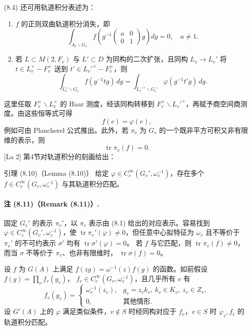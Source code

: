(8.4) 还可用轨道积分表述为：
\begin{enumerate}
\item[(i)] $f$ 的正则双曲轨道积分消失，即
\begin{equation}
 \int_{A_v\backslash G_v}f\!\left(g^{-1}\begin{pmatrix}a&0\\0&1\end{pmatrix}g\right)dg=0,
 \quad a\ne1.\tag{8.7}
\end{equation}
\item[(ii)] 若 $L\subset M(2,F_v)$ 与 $L'\subset D$ 为同构的二次扩张，且同构
$L_v\to L_v'$ 将 $t\in L_v^\times-F_v^\times$ 送到 $t'\in L_v'^\times-F_v^\times$，则
\[
 \int_{L_v^\times\backslash G_v}f(g^{-1}tg)\,dg
 =\int_{L_v'^\times\backslash G_v'}\varphi(g^{-1}t'g)\,dg.
\]
\end{enumerate}
这里任取 $F_v^\times\backslash L_v^\times$ 的 Haar 测度，经该同构转移到
$F_v^\times\backslash L_v'^\times$，再赋予商空间商测度。由这些恒等式可得
\begin{equation}
 f(e)=\varphi(e),\tag{8.8}
\end{equation}
例如可由 Plancherel 公式推出。此外，若 $\pi_v$ 为 $G_v$ 的一个既非平方可积又非有限维的表示，则
\begin{equation}
 \operatorname{tr}\pi_v(f)=0.\tag{8.9}
\end{equation}
[La 2] 第4节对轨道积分的刻画给出：
\begin{originaltheorem}{引理 (8.10)（Lemma (8.10)）}
给定 $\varphi\in C_c^\infty(G_v',\omega_v^{-1})$，存在多个
$f\in C_c^\infty(G_v,\omega_v^{-1})$ 与其轨道积分匹配。
\end{originaltheorem}

\paragraph*{注 (8.11)（Remark (8.11)）.}
固定 $G_v'$ 的表示 $\pi_v'$，以 $\pi_v$ 表示由 (8.1) 给出的对应表示。容易找到
$\varphi\in C_c^\infty(G_v',\omega_v^{-1})$，使 $\operatorname{tr}\pi_v'(\varphi)\ne0$，但任意中心拟特征为
$\omega_v$ 且不等价于 $\pi_v'$ 的不可约表示 $\sigma'$ 均有 $\operatorname{tr}\sigma'(\varphi)=0$。
若 $f$ 与它匹配，则 $\operatorname{tr}\pi_v(f)\ne0$，而当 $\sigma$ 不等价于 $\pi_v$、也非有限维时，
$\operatorname{tr}\sigma(f)=0$。

设 $f$ 为 $G(A)$ 上满足 $f(zg)=\omega^{-1}(z)f(g)$ 的函数。如前假设 $f(g)=\prod_vf_v(g_v)$，
$f_v\in C_c^\infty(G_v,\omega_v^{-1})$，且几乎所有 $v$ 有
\[
 f_v(g_v)=\begin{cases}\omega_v^{-1}(z_v),&g_v=z_vk_v,\ k_v\in K_v,\ z_v\in Z_v,\\0,&\text{其他情形}.
 \end{cases}
\]
设 $G'(A)$ 上的 $\varphi$ 满足类似条件，$v\notin S$ 时经同构对应于 $f_v$，$v\in S$ 时
$\varphi_v,f_v$ 的轨道积分匹配。

